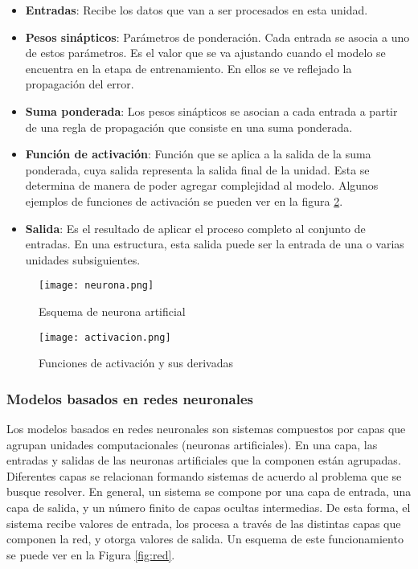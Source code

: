 \begin{itemize}
    \item \textbf{Entradas}: Recibe los datos que van a ser procesados en esta unidad.
    \item \textbf{Pesos sinápticos}: Parámetros de ponderación. Cada entrada se asocia a uno de estos parámetros. Es el valor que se va ajustando cuando el modelo se encuentra en la etapa de entrenamiento. En ellos se ve reflejado la propagación del error. 
    
    \item \textbf{Suma ponderada}: Los pesos sinápticos se asocian a cada entrada a partir de una regla de propagación que consiste en una suma ponderada.
    \item \textbf{Función de activación}: Función que se aplica a la salida de la suma ponderada, cuya salida representa la salida final de la unidad. Esta se determina de manera de poder agregar complejidad al modelo. Algunos ejemplos de funciones de activación se pueden ver en la figura \ref{fig:activación}. 
    
    \item \textbf{Salida}: Es el resultado de aplicar el proceso completo al conjunto de entradas. En una estructura, esta salida puede ser la entrada de una o varias unidades subsiguientes. 
\end{itemize}

\begin{figure}[H]
  \centering{}
  \texttt{[image: neurona.png]}
  \caption{Esquema de neurona artificial}
  \label{fig:neurona}
\end{figure}

\begin{figure}[H]
  \centering{}
  \texttt{[image: activacion.png]}
  \caption{Funciones de activación y sus derivadas}
  \label{fig:activación}
\end{figure}

\subsubsection{Modelos basados en redes neuronales}

Los modelos basados en redes neuronales son sistemas compuestos por capas que agrupan unidades computacionales (neuronas artificiales). En una capa, las entradas y salidas de las neuronas artificiales que la componen están agrupadas. Diferentes capas se relacionan formando sistemas de acuerdo al problema que se busque resolver. En general, un sistema se compone por una capa de entrada, una capa de salida, y un número finito de capas ocultas intermedias. De esta forma, el sistema recibe valores de entrada, los procesa a través de las distintas capas que componen la red, y otorga valores de salida. Un esquema de este funcionamiento se puede ver en la Figura \ref{fig:red}.

